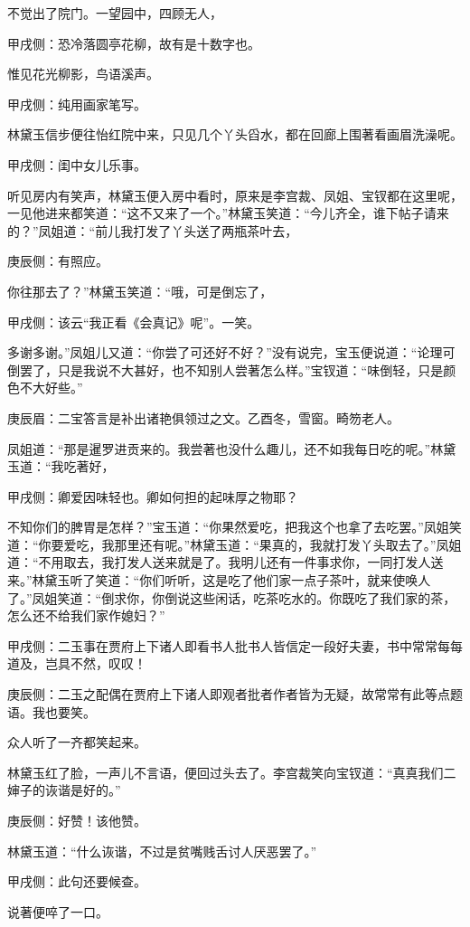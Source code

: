 \begin{parag}
    不觉出了院门。一望园中，四顾无人，\begin{note}甲戌侧：恐冷落圆亭花柳，故有是十数字也。\end{note}惟见花光柳影，鸟语溪声。\begin{note}甲戌侧：纯用画家笔写。\end{note}林黛玉信步便往怡红院中来，只见几个丫头舀水，都在回廊上围著看画眉洗澡呢。\begin{note}甲戌侧：闺中女儿乐事。\end{note}听见房内有笑声，林黛玉便入房中看时，原来是李宫裁、凤姐、宝钗都在这里呢，一见他进来都笑道：“这不又来了一个。”林黛玉笑道：“今儿齐全，谁下帖子请来的？”凤姐道：“前儿我打发了丫头送了两瓶茶叶去，\begin{note}庚辰侧：有照应。\end{note}你往那去了？”林黛玉笑道：“哦，可是倒忘了，\begin{note}甲戌侧：该云“我正看《会真记》呢”。一笑。\end{note}多谢多谢。”凤姐儿又道：“你尝了可还好不好？”没有说完，宝玉便说道：“论理可倒罢了，只是我说不大甚好，也不知别人尝著怎么样。”宝钗道：“味倒轻，只是颜色不大好些。”\begin{note}庚辰眉：二宝答言是补出诸艳俱领过之文。乙酉冬，雪窗。畸笏老人。\end{note}凤姐道：“那是暹罗进贡来的。我尝著也没什么趣儿，还不如我每日吃的呢。”林黛玉道：“我吃著好，\begin{note}甲戌侧：卿爱因味轻也。卿如何担的起味厚之物耶？\end{note}不知你们的脾胃是怎样？”宝玉道：“你果然爱吃，把我这个也拿了去吃罢。”凤姐笑道：“你要爱吃，我那里还有呢。”林黛玉道：“果真的，我就打发丫头取去了。”凤姐道：“不用取去，我打发人送来就是了。我明儿还有一件事求你，一同打发人送来。”林黛玉听了笑道：“你们听听，这是吃了他们家一点子茶叶，就来使唤人了。”凤姐笑道：“倒求你，你倒说这些闲话，吃茶吃水的。你既吃了我们家的茶，怎么还不给我们家作媳妇？”\begin{note}甲戌侧：二玉事在贾府上下诸人即看书人批书人皆信定一段好夫妻，书中常常每每道及，岂具不然，叹叹！\end{note}\begin{note}庚辰侧：二玉之配偶在贾府上下诸人即观者批者作者皆为无疑，故常常有此等点题语。我也要笑。\end{note}众人听了一齐都笑起来。
\end{parag}


\begin{parag}
    林黛玉红了脸，一声儿不言语，便回过头去了。李宫裁笑向宝钗道：“真真我们二婶子的诙谐是好的。”\begin{note}庚辰侧：好赞！该他赞。\end{note}林黛玉道：“什么诙谐，不过是贫嘴贱舌讨人厌恶罢了。”\begin{note}甲戌侧：此句还要候查。\end{note}说著便啐了一口。
\end{parag}


